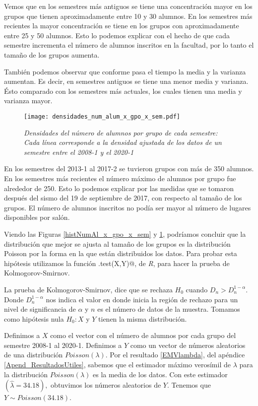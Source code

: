 Vemos que en los semestres más antiguos se tiene una concentración mayor en los grupos que tienen aproximadamente entre 10 y 30 alumnos. En los semestres más recientes la mayor concentración se tiene en los grupos con aproximadamente entre 25 y 50 alumnos. Esto lo podemos explicar con el hecho de que cada semestre incrementa el número de alumnos inscritos en la facultad, por lo tanto el tamaño de los grupos aumenta.

También podemos observar que conforme pasa el tiempo la media y la varianza aumentan. Es decir, en semestres antiguos se tiene una menor media y varianza. Ésto comparado con los semestres más actuales, los cuales tienen una media y varianza mayor.

\begin{figure}[H]
\centering
\texttt{[image: densidades\_num\_alum\_x\_gpo\_x\_sem.pdf]} %
\caption[\textit{Densidades del número de alumnos por grupo de cada semestre}]{\textit{Densidades del número de alumnos por grupo de cada semestre: Cada línea corresponde a la densidad ajustada de los datos de un semestre entre el 2008-1 y el 2020-1}}\label{densidadesNumAl_x_gpo_x_sem}
\end{figure}

En los semestres del 2013-1 al 2017-2 se tuvieron grupos con más de 350 alumnos. En los semestres más recientes el número máximo de alumnos por grupo fue alrededor de 250. Esto lo podemos explicar por las medidas que se tomaron después del sismo del 19 de septiembre de 2017, con respecto al tamaño de los grupos. El número de alumnos inscritos no podía ser mayor al número de lugares disponibles por salón.

Viendo las Figuras \ref{histNumAl_x_gpo_x_sem} y \ref{densidadesNumAl_x_gpo_x_sem}, podríamos concluir que la distribución que mejor se ajusta al tamaño de los grupos es la distribución Poisson por la forma en la que están distribuidos los datos. Para probar esta hipótesis utilizamos la función \verb@ks.test(X,Y)@, de \textit{R}, para hacer la prueba de Kolmogorov-Smirnov.

La prueba de Kolmogorov-Smirnov, dice que se rechaza $H_{0}$ cuando $D_{n} > D_{n}^{1-\alpha}$. Donde $D_{n}^{1-\alpha}$ nos indica el valor en donde inicia la región de rechazo para un nivel de significancia de $\alpha$ y $n$ es el número de datos de la muestra. Tomamos como hipótesis nula $H_{0}: X$ y $Y$ tienen la misma distribución.

Definimos a $X$ como el vector con el número de alumnos por cada grupo del semestre 2008-1 al 2020-1. Definimos a $Y$ como un vector de números aleatorios de una distribución $Poisson(\lambda)$. Por el resultado \ref{EMVlambda}, del apéndice \ref{Apend_ResultadosUtiles}, sabemos que el estimador máximo verosímil de $\lambda$ para la distribución $Poisson(\lambda)$ es la media de los datos. Con este estimador $(\hat{\lambda} = 34.18),$ obtuvimos los números aleatorios de $Y$. Tenemos que $Y \sim Poisson(34.18)$.%


